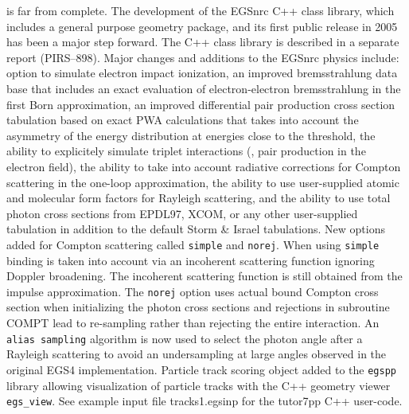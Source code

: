 is far from complete. The development of the EGSnrc C++ class 
library, which includes a general purpose geometry package, and its 
first public release in 2005 has been a major step forward. 
The C++ class library is described in a separate report (PIRS--898). 
Major changes and additions to the EGSnrc physics include: 
option to simulate electron impact ionization, an improved 
bremsstrahlung data base that includes an exact evaluation of 
electron-electron bremsstrahlung in the first Born approximation, 
an improved differential pair production cross section tabulation 
based on exact PWA calculations that takes into account the asymmetry 
of the energy distribution at energies close to the threshold, 
the ability to explicitely 
simulate triplet interactions (\ie, pair production in the electron field), 
the ability to take into account radiative corrections for Compton 
scattering in the one-loop approximation, the ability to use 
user-supplied atomic and molecular form factors for Rayleigh scattering, 
and the ability to use total photon cross sections from EPDL97, XCOM, or 
any other user-supplied tabulation in addition to the default 
Storm \& Israel tabulations. 
New options added for Compton scattering called {\tt simple} and 
{\tt norej}. When using {\tt simple} binding is taken
into account via an incoherent scattering function 
ignoring Doppler broadening. The incoherent scattering function 
is still obtained from the impulse approximation. 
The {\tt norej} option uses actual bound Compton cross section 
when initializing the photon cross sections and rejections in 
subroutine COMPT lead to re-sampling rather than rejecting the 
entire interaction.
An {\tt alias sampling} algorithm is now used to select the 
photon angle after a Rayleigh scattering to avoid an undersampling
at large angles observed in the original EGS4 implementation.
Particle track scoring object added to the {\tt egspp} library
allowing visualization of particle tracks with the C++ geometry
viewer {\tt egs\_view}. See example input file tracks1.egsinp for 
the tutor7pp C++ user-code.

